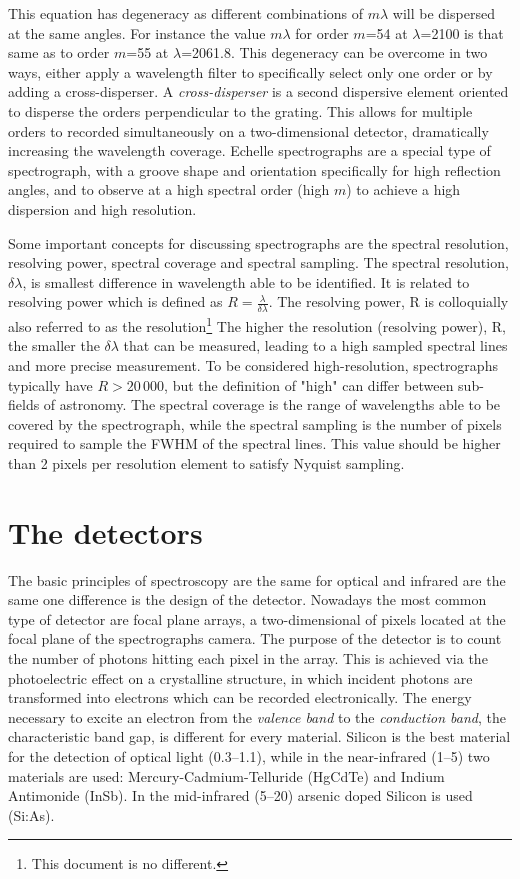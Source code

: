 This equation has degeneracy as different combinations of $m \lambda$ will be dispersed at the same angles.
For instance the value $m \lambda$ for order $m$=54 at $\lambda$=2100\nm{} is that same as to order $m$=55 at $\lambda$=2061.8\nm{}.
This degeneracy can be overcome in two ways, either apply a wavelength filter to specifically select only one order or by adding a cross-disperser.
A \emph{cross-disperser} is a second dispersive element oriented to disperse the orders perpendicular to the grating.
This allows for multiple orders to recorded simultaneously on a two-dimensional detector, dramatically increasing the wavelength coverage.
Echelle spectrographs are a special type of spectrograph, with a groove shape and orientation specifically for high reflection angles, and to observe at a high spectral order (high $m$) to achieve a high dispersion and high resolution.

Some important concepts for discussing spectrographs are the spectral resolution, resolving power, spectral coverage and spectral sampling.
The spectral resolution, \(\delta \lambda\), is smallest difference in wavelength able to be identified.
It is related to resolving power which is defined as \(R=\frac{\lambda}{\delta\lambda}\).
The resolving power, R is colloquially also referred to as the resolution\footnote{This document is no different.} The higher the resolution (resolving power), R, the smaller the \(\delta\lambda\) that can be measured, leading to a high sampled spectral lines and more precise measurement.
To be considered high-resolution, spectrographs typically have \(R>20\,000\), but the definition of "high" can differ between sub-fields of astronomy.
The spectral coverage is the range of wavelengths able to be covered by the spectrograph, while the spectral sampling is the number of pixels required to sample the {FWHM} of the spectral lines.
This value should be higher than 2 pixels per resolution element to satisfy Nyquist sampling.

\section{The detectors}
\label{subsec:nir_detectors}
The basic principles of spectroscopy are the same for optical and infrared are the same one difference is the design of the detector.
Nowadays the most common type of detector are focal plane arrays, a two-dimensional of pixels located at the focal plane of the spectrographs camera.
The purpose of the detector is to count the number of photons hitting each pixel in the array.
This is achieved via the photoelectric effect on a crystalline structure, in which incident photons are transformed into electrons which can be recorded electronically.
The energy necessary to excite an electron from the \emph{valence band} to the \emph{conduction band}, the characteristic band gap, is different for every material.
Silicon is the best material for the detection of optical light (0.3--1.1\um), while in the near-infrared (1--5\um) two materials are used: {Mercury-Cadmium-Telluride} (\si{HgCdTe}) and {Indium Antimonide} (\si{InSb}).
In the mid-infrared (5--20\um) arsenic doped Silicon is used (\si{Si}:\si{As}).

